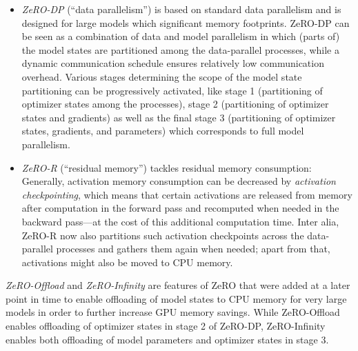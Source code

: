 \begin{itemize}
    \item \textit{ZeRO-DP} (\enquote{data parallelism}) is based on standard
          data parallelism and is designed for large models which significant
          memory footprints. ZeRO-DP can be seen as a combination of data and model
          parallelism in which (parts of) the model states are partitioned
          among the data-parallel processes, while a dynamic communication
          schedule ensures relatively low communication overhead. Various stages
          determining the scope of the model state partitioning can be progressively
          activated, like stage 1 (partitioning of optimizer states among the processes), 
          stage 2 (partitioning of optimizer states and gradients) as well as 
          the final stage 3 (partitioning of optimizer states, gradients, and 
          parameters) which corresponds to full model parallelism.
    \item \textit{ZeRO-R} (\enquote{residual memory}) tackles residual memory consumption: 
          Generally, activation memory consumption can be decreased by 
          \textit{activation checkpointing}, which means that certain activations
          are released from memory after computation in the forward pass and
          recomputed when needed in the backward pass---at the cost of this additional
          computation time. Inter alia, ZeRO-R now also partitions such activation 
          checkpoints across the data-parallel processes and gathers them again when 
          needed; apart from that, activations might also be moved to CPU memory. 
\end{itemize}

\textit{ZeRO-Offload} \cite{DBLP:journals/corr/abs-2101-06840} and 
\textit{ZeRO-Infinity} \cite{DBLP:journals/corr/abs-2104-07857} are features of ZeRO
that were added at a later point in time to enable offloading of model states to CPU memory 
for very large models in order to further increase GPU memory savings. While ZeRO-Offload 
enables offloading of optimizer states in stage 2 of ZeRO-DP, ZeRO-Infinity
enables both offloading of model parameters and optimizer states in stage 3.